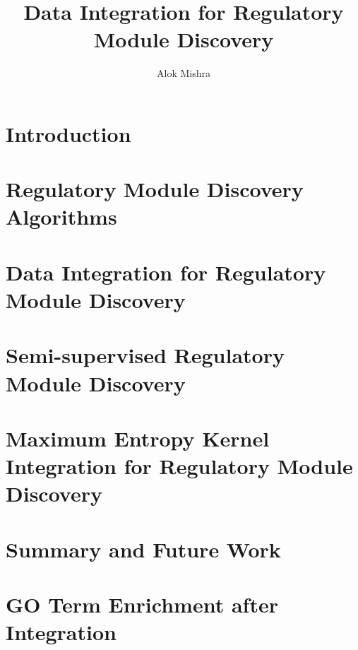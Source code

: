 \documentclass[a4paper,12pt,oneside]{book}
\begin{document}
\symbolfootnote

%

\title{\LARGE {\bf Data Integration for Regulatory Module Discovery}\\
 \vspace*{6mm}
}

\author{Alok Mishra}


\frontmatter
\maketitle





\body
\mediumlinespacing
\mainmatter
\chapter{Introduction}


\chapter{Regulatory Module Discovery Algorithms}


\chapter{Data Integration for Regulatory Module Discovery}
 

\chapter{Semi-supervised Regulatory Module Discovery}


\chapter{Maximum Entropy Kernel Integration for Regulatory Module Discovery} \label{chap_maxent}


\chapter{Summary and Future Work}


\appendix
\addappheadtotoc

\chapter{GO Term Enrichment after Integration} \label{appendix:go_enrichment_results}



\aloklinespacing
{}
 
%
\aloklinespacing

\end{document}
